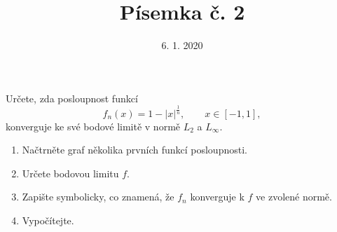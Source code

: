 \documentclass{article}
\begin{document}
\title{Písemka č. 2}
\date{6. 1. 2020}
\author{}
\maketitle

\noindent
Určete, zda posloupnost funkcí
\[
f_n(x) = 1-|x|^{\frac{1}{n}}, \qquad x\in[-1,1],
\]
konverguje ke své bodové limitě v normě $L_2$ a $L_\infty$.

\vspace{2cm}

\begin{enumerate}
\item Načtrněte graf několika prvních funkcí posloupnosti.
\item Určete bodovou limitu $f$.
\item Zapište symbolicky, co znamená, že $f_n$ konverguje k $f$ ve zvolené normě.
\item Vypočítejte.
\end{enumerate}
\end{document}
